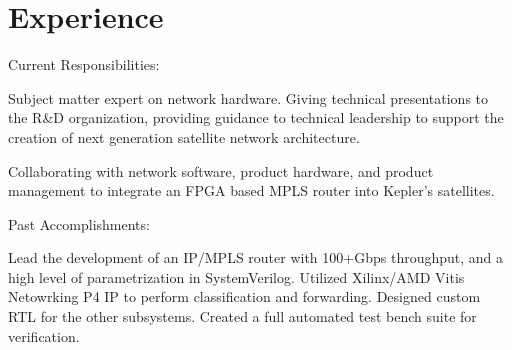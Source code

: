 \documentclass[10pt]{deedy-resume-reversed}
\begin{document}
%
%

%
%

%
%

\begin{minipage}[t]{1.0\textwidth}


\section{Experience}
Current Responsibilities:
\vspace{\topsep} %
\begin{tightemize}
\item Subject matter expert on network hardware. Giving technical presentations to the R\&D organization,
providing guidance to technical leadership to support the creation of next generation satellite network architecture.
\item Collaborating with network software, product hardware, and product management to integrate
an FPGA based MPLS router into Kepler's satellites.
\end{tightemize}
Past Accomplishments:
\begin{tightemize}
\item Lead the development of an IP/MPLS router with 100+Gbps throughput, and a high level of parametrization in SystemVerilog.
Utilized Xilinx/AMD Vitis Netowrking P4 IP to perform classification and forwarding. Designed custom RTL for the other
subsystems. Created a full automated test bench suite for verification.
\end{tightemize}
\sectionsep


\end{minipage}
\end{document}

